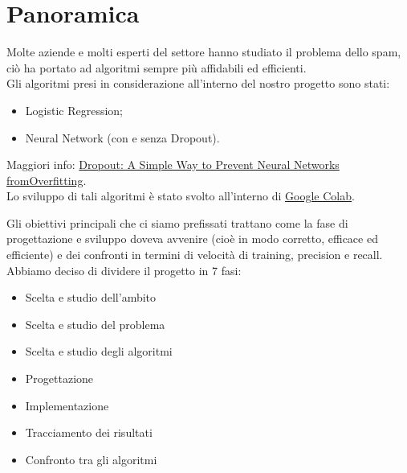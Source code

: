 \newpage
\section{Panoramica}
Molte aziende e molti esperti del settore hanno studiato il problema dello spam, ciò ha portato ad algoritmi sempre più affidabili ed efficienti.\\
Gli algoritmi presi in considerazione all'interno del nostro progetto sono stati:
\begin{itemize}
	\item Logistic Regression;
	\item Neural Network (con e senza Dropout). 
\end{itemize}
Maggiori info: \href{http://www.jmlr.org/papers/volume15/srivastava14a/srivastava14a.pdf}{Dropout: A Simple Way to Prevent Neural Networks fromOverfitting}.\\
Lo sviluppo di tali algoritmi è stato svolto all'interno di \href{https://colab.research.google.com/notebooks/welcome.ipynb}{Google Colab}. 

Gli obiettivi principali che ci siamo prefissati trattano come la fase di progettazione e sviluppo doveva avvenire (cioè in modo corretto, efficace ed efficiente) e dei confronti in termini di velocità di training, precision e recall.
Abbiamo deciso di dividere il progetto in 7 fasi:
\begin{itemize}
	\item{Scelta e studio dell'ambito}
	\item{Scelta e studio del problema}
	\item{Scelta e studio degli algoritmi}
	\item{Progettazione}
	\item{Implementazione}
	\item{Tracciamento dei risultati}
	\item{Confronto tra gli algoritmi}
\end{itemize}

\newpage